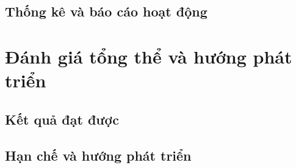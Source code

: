 \subsection{Thống kê và báo cáo hoạt động}


\section{Đánh giá tổng thể và hướng phát triển}

\subsection{Kết quả đạt được}


\subsection{Hạn chế và hướng phát triển}



